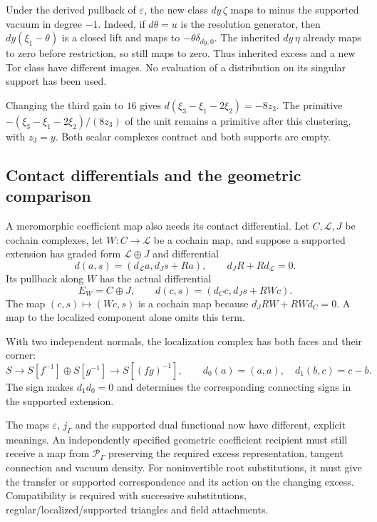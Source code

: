 Under the derived pullback of $\varepsilon$, the new class
$dy\,\zeta$ maps to minus the supported vacuum in degree $-1$.
Indeed, if $d\theta=u$ is the resolution generator, then
$dy(\xi_1-\theta)$ is a closed lift and maps to
$-\theta\delta_{dy,0}$. The inherited $dy\,\eta$ already maps
to zero before restriction, so still maps to zero.
Thus inherited excess and a new Tor class have different
images. No evaluation of a distribution on its singular
support has been used.

Changing the third gain to $16$ gives
$d(\xi_3-\xi_1-2\xi_2)=-8z_3$.
The primitive $-(\xi_3-\xi_1-2\xi_2)/(8z_3)$ of the unit
remains a primitive after this clustering, with $z_3=y$.
Both scalar complexes contract and both supports are empty.

\subsection{Contact differentials and the geometric comparison}

A meromorphic coefficient map also needs its contact
differential. Let $C,\mathcal L,J$ be cochain complexes,
let $W:C\to\mathcal L$ be a cochain map, and suppose a supported
extension has graded form $\mathcal L\oplus J$ and differential
\[
 d(a,s)=(d_{\mathcal L}a,d_Js+Ra),\qquad
 d_JR+Rd_{\mathcal L}=0.
\]
Its pullback along $W$ has the actual differential
\[
 E_W=C\oplus J,\qquad d(c,s)=(d_Cc,d_Js+RWc).
\]
The map $(c,s)\mapsto(Wc,s)$ is a cochain map because
$d_JRW+RWd_C=0$. A map to the localized component alone
omits this term.

With two independent normals, the localization
complex has both faces and their corner:
\[
 S\longrightarrow S[f^{-1}]\oplus S[g^{-1}]
       \longrightarrow S[(fg)^{-1}],
 \qquad d_0(a)=(a,a),\quad d_1(b,c)=c-b.
\]
The sign makes $d_1d_0=0$ and determines the corresponding
connecting signs in the supported extension.

The maps $\varepsilon$, $j_\Gamma$ and the supported dual
functional now have different, explicit meanings.
An independently specified geometric coefficient recipient
must still receive a map from $\mathcal P_\Gamma$ preserving
the required excess representation, tangent connection and
vacuum density. For noninvertible root substitutions, it
must give the transfer or supported correspondence and its
action on the changing excess. Compatibility is required with
successive substitutions, regular/localized/supported triangles
and field attachments.

